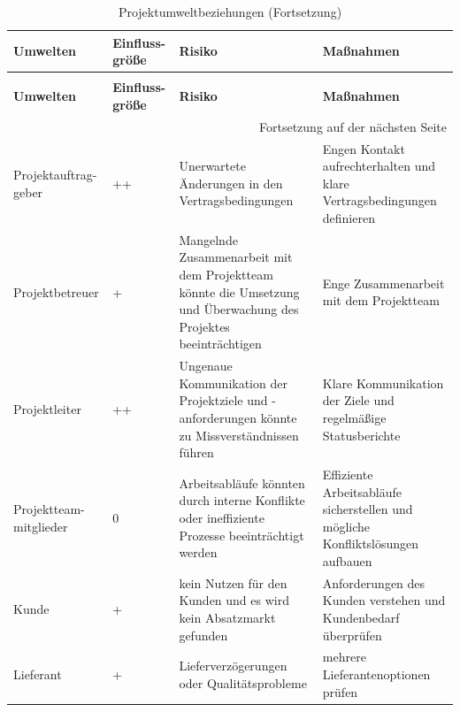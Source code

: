 \begin{longtable}{p{} | p{} | p{} | p{}}
	\caption{Projektumweltbeziehungen}
	\label{tab:umweltbeziehungen}
	\\ \toprule
	\textbf{Umwelten} & \textbf{Einfluss-größe} & \textbf{Risiko} & \textbf{Maßnahmen}
	\\ \midrule
	\endfirsthead
	\caption{Projektumweltbeziehungen (Fortsetzung)}
	\\ \toprule
	\textbf{Umwelten} & \textbf{Einfluss-größe} & \textbf{Risiko} & \textbf{Maßnahmen}
	\\ \midrule
	\endhead
	\midrule
	\multicolumn{4}{r}{{Fortsetzung auf der nächsten Seite}} 
	\\ \bottomrule
	\endfoot
	\bottomrule
	\endlastfoot
	Projektauftrag-geber & ++ & Unerwartete Änderungen in den Vertragsbedingungen & Engen Kontakt aufrechterhalten und klare Vertragsbedingungen definieren \\
	\midrule
	Projektbetreuer & + & Mangelnde Zusammenarbeit mit dem Projektteam könnte die Umsetzung und Überwachung des Projektes beeinträchtigen & Enge Zusammenarbeit mit dem Projektteam \\
	Projektleiter & ++ & Ungenaue Kommunikation der Projektziele und -anforderungen könnte zu Missverständnissen führen & Klare Kommunikation der Ziele und regelmäßige Statusberichte \\
	\midrule
	Projektteam-mitglieder & 0 & Arbeitsabläufe könnten durch interne Konflikte oder ineffiziente Prozesse beeinträchtigt werden & Effiziente Arbeitsabläufe sicherstellen und mögliche Konfliktslösungen aufbauen \\
	\midrule
	Kunde & + & kein Nutzen für den Kunden und es wird  kein Absatzmarkt gefunden & Anforderungen des Kunden verstehen und Kundenbedarf überprüfen \\
	\midrule
	Lieferant & + & Lieferverzögerungen oder Qualitätsprobleme & mehrere Lieferantenoptionen prüfen \\
\end{longtable}
